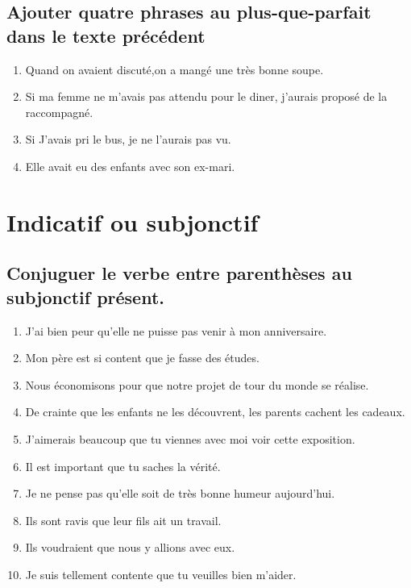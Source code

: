 \documentclass[12pt]{article}
\newcommand{\bleu}[1]{{\color{blue}#1}}
\begin{document}
\subsection{Ajouter quatre phrases au plus-que-parfait dans le texte précédent}
\begin{enumerate}
	\item Quand on avaient discuté,on a mangé une très bonne soupe.
	\item Si ma femme ne m'avais pas attendu pour le diner, j'aurais proposé de la raccompagné. 
	\item Si J'avais pri le bus, je ne l'aurais pas vu.
	\item Elle avait eu des enfants avec son ex-mari.
\end{enumerate}


\section{Indicatif ou subjonctif}
\subsection{Conjuguer le verbe entre parenthèses au subjonctif présent.}
\begin{enumerate}
	\item J’ai bien peur qu’elle ne \bleu{puisse} pas venir à mon anniversaire.
	\item Mon père est si content que je \bleu{fasse} des études.
	\item Nous économisons pour que notre projet de tour du monde \bleu{se réalise}.
	\item De crainte que les enfants ne les \bleu{découvrent}, les parents cachent les cadeaux.
	\item J’aimerais beaucoup que tu \bleu{viennes} avec moi voir cette exposition.
	\item Il est important que tu \bleu{saches} la vérité.
	\item Je ne pense pas qu’elle \bleu{soit} de très bonne humeur aujourd'hui.
	\item Ils sont ravis que leur fils \bleu{ait} un travail.
	\item Ils voudraient que nous y \bleu{allions} avec eux.
	\item Je suis tellement contente que tu \bleu{veuilles} bien m’aider.
\end{enumerate}
\end{document}
